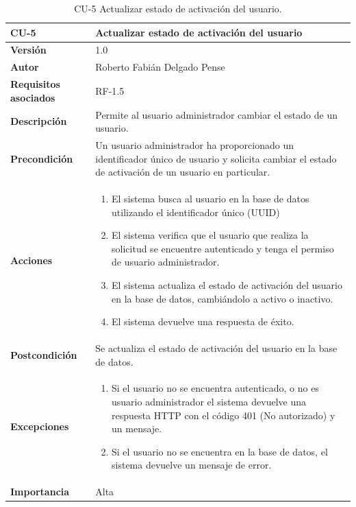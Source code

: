 \begin{table}[p]
	\centering
	\begin{tabularx}{\linewidth}{ p{} p{} }
		\toprule
		\textbf{CU-5}    & \textbf{Actualizar estado de activación del usuario}\\
		\toprule
		\textbf{Versión}              & 1.0    \\
		\textbf{Autor}                & Roberto Fabián Delgado Pense \\
		\textbf{Requisitos asociados} & RF-1.5 \\ 
		\textbf{Descripción}          & Permite al usuario administrador cambiar el estado de un usuario. \\
		\textbf{Precondición}         & Un usuario administrador ha proporcionado un identificador único de usuario y                                              solicita cambiar el estado de activación de un usuario en particular.\\
		\textbf{Acciones}             &
		\begin{enumerate}
			\def\labelenumi{\arabic{enumi}.}
			\tightlist
			\item El sistema busca al usuario en la base de datos utilizando el identificador único (UUID)
                \item El sistema verifica que el usuario que realiza la solicitud se encuentre autenticado y tenga el        permiso de usuario administrador.
			\item El sistema actualiza el estado de activación del usuario en la base de datos, cambiándolo a activo             o inactivo.
                \item El sistema devuelve una respuesta de éxito.
            \end{enumerate}\\
		\textbf{Postcondición}        & Se actualiza el estado de activación del usuario en la base de datos.\\
  
		\textbf{Excepciones}          & 
                \begin{enumerate}
			\def\labelenumi{\arabic{enumi}.}
			\tightlist
			\item Si el usuario no se encuentra autenticado, o no es usuario administrador el sistema devuelve una                 respuesta HTTP con el código 401 (No autorizado) y un mensaje.
                \item   Si el usuario no se encuentra en la base de datos, el sistema devuelve un                                            mensaje de error. 
            \end{enumerate}\\
		\textbf{Importancia}          & Alta \\
		\bottomrule
	\end{tabularx}
	\caption{CU-5 Actualizar estado de activación del usuario.}
\end{table}

